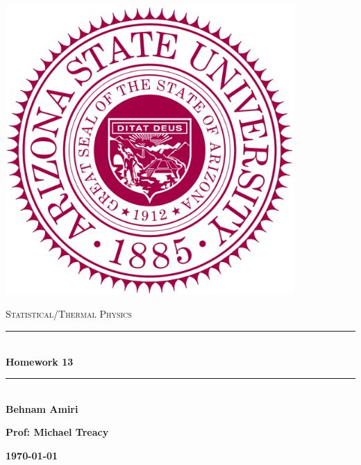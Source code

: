 \documentclass[fleqn]{article}
\begin{document}
  \begin{titlepage}

    \newcommand{\HRule}{\rule{\linewidth}{0.5mm}}

    \center

    \begin{center}
      \includegraphics[height=11cm, width=11cm]{asu.png}
    \end{center}

    \vline

    \textsc{\LARGE Statistical/Thermal Physics}\\[1.5cm]

    \HRule \\[0.5cm]
    { \huge \bfseries Homework 13}\\[0.4cm] 
    \HRule \\[1.0cm]

    \textbf{Behnam Amiri}

    \bigbreak

    \textbf{Prof: Michael Treacy}

    \bigbreak

    \textbf{{\large \today}\\[2cm]}

    \vfill

  \end{titlepage}
\end{document}
